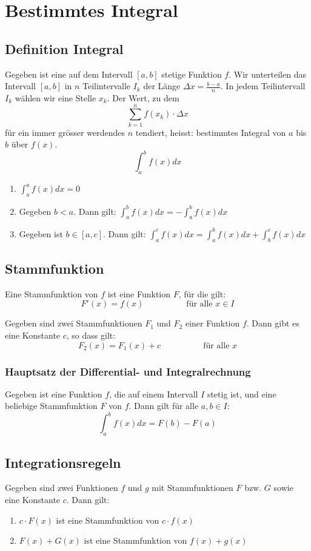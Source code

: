\newpage

\section{Bestimmtes Integral}

\subsection{Definition Integral}
Gegeben ist eine auf dem Intervall $[a,b]$ stetige Funktion $f$. Wir unterteilen das Intervall $[a,b]$ in $n$ Teilintervalle $I_k$ der Länge $\Delta x = \frac{b-a}{n}$. In jedem Teilintervall $I_k$ wählen wir eine Stelle $x_k$. Der Wert, zu dem
\[
    \sum_{k=1}^{n} f(x_k) \cdot \Delta x
\]
für ein immer grösser werdendes $n$ tendiert, heisst: bestimmtes Integral von $a$ bis $b$ über $f(x)$.
\[
    \int_{a}^{b} f(x)dx
\]

\begin{enumerate}
    \item $\int_{a}^{a} f(x) dx = 0$
    \item Gegeben $b < a$. Dann gilt: $\int_{a}^{b} f(x) dx = - \int_{a}^{b} f(x) dx$
    \item Gegeben ist $b \in [a, c]$. Dann gilt: $\int_{a}^{c} f(x) dx = \int_{a}^{b} f(x) dx + \int_{b}^{c} f(x) dx$
\end{enumerate}

\subsection{Stammfunktion}
Eine Stammfunktion von $f$ ist eine Funktion $F$, für die gilt:
\[
    F'(x) = f(x) \hspace{5em} \text{für alle } x \in I
\]

Gegeben sind zwei Stammfunktionen $F_1$ und $F_2$ einer Funktion $f$. Dann gibt es eine Konstante $c$, so dass gilt:
\[
    F_2(x) = F_1(x) + c \hspace{5em} \text{für alle } x
\]

\subsubsection{Hauptsatz der Differential- und Integralrechnung}
Gegeben ist eine Funktion $f$, die auf einem Intervall $I$ stetig ist, und eine beliebige Stammfunktion $F$ von $f$. Dann gilt für alle $a,b \in I$:
\[
    \int_{a}^{b} f(x) dx = F(b) - F(a)
\]

\subsection{Integrationsregeln}
Gegeben sind zwei Funktionen $f$ und $g$ mit Stammfunktionen $F$ bzw. $G$ sowie eine Konstante $c$. Dann gilt:
\begin{enumerate}
    \item $c \cdot F(x)$ ist eine Stammfunktion von $c \cdot f(x)$
    \item $F(x) + G(x)$ ist eine Stammfunktion von $f(x) + g(x)$
\end{enumerate}

